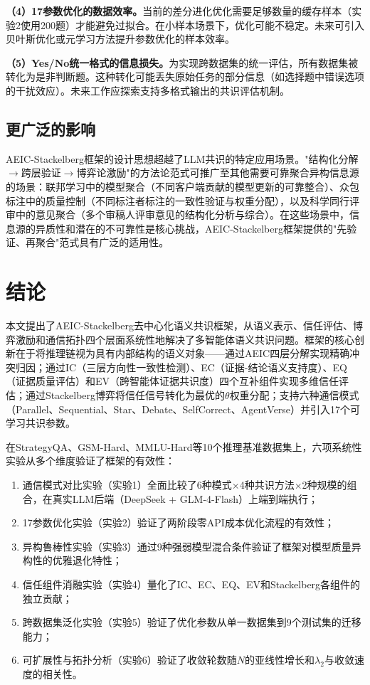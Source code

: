 \documentclass[12pt,a4paper,UTF8,fontset=fandol]{ctexart}
\begin{document}
\textbf{（4）17参数优化的数据效率。}当前的差分进化优化需要足够数量的缓存样本（实验2使用200题）才能避免过拟合。在小样本场景下，优化可能不稳定。未来可引入贝叶斯优化或元学习方法提升参数优化的样本效率。

\textbf{（5）Yes/No统一格式的信息损失。}为实现跨数据集的统一评估，所有数据集被转化为是非判断题。这种转化可能丢失原始任务的部分信息（如选择题中错误选项的干扰效应）。未来工作应探索支持多格式输出的共识评估机制。

\subsection{更广泛的影响}

AEIC-Stackelberg框架的设计思想超越了LLM共识的特定应用场景。"结构化分解$\to$跨层验证$\to$博弈论激励"的方法论范式可推广至其他需要可靠聚合异构信息源的场景：联邦学习中的模型聚合（不同客户端贡献的模型更新的可靠整合）、众包标注中的质量控制（不同标注者标注的一致性验证与权重分配），以及科学同行评审中的意见聚合（多个审稿人评审意见的结构化分析与综合）。在这些场景中，信息源的异质性和潜在的不可靠性是核心挑战，AEIC-Stackelberg框架提供的"先验证、再聚合"范式具有广泛的适用性。

\section{结论}\label{sec:conclusion}

本文提出了AEIC-Stackelberg去中心化语义共识框架，从语义表示、信任评估、博弈激励和通信拓扑四个层面系统性地解决了多智能体语义共识问题。框架的核心创新在于将推理链视为具有内部结构的语义对象——通过AEIC四层分解实现精确冲突归因；通过IC（三层方向性一致性检测）、EC（证据-结论语义支持度）、EQ（证据质量评估）和EV（跨智能体证据共识度）四个互补组件实现多维信任评估；通过Stackelberg博弈将信任信号转化为最优的$\theta$权重分配；支持六种通信模式（Parallel、Sequential、Star、Debate、SelfCorrect、AgentVerse）并引入17个可学习共识参数。

在StrategyQA、GSM-Hard、MMLU-Hard等10个推理基准数据集上，六项系统性实验从多个维度验证了框架的有效性：
\begin{enumerate}[nosep]
    \item 通信模式对比实验（实验1）全面比较了6种模式$\times$4种共识方法$\times$2种规模的组合，在真实LLM后端（DeepSeek + GLM-4-Flash）上端到端执行；
    \item 17参数优化实验（实验2）验证了两阶段零API成本优化流程的有效性；
    \item 异构鲁棒性实验（实验3）通过9种强弱模型混合条件验证了框架对模型质量异构性的优雅退化特性；
    \item 信任组件消融实验（实验4）量化了IC、EC、EQ、EV和Stackelberg各组件的独立贡献；
    \item 跨数据集泛化实验（实验5）验证了优化参数从单一数据集到9个测试集的迁移能力；
    \item 可扩展性与拓扑分析（实验6）验证了收敛轮数随$N$的亚线性增长和$\lambda_2$与收敛速度的相关性。
\end{enumerate}
\end{document}
